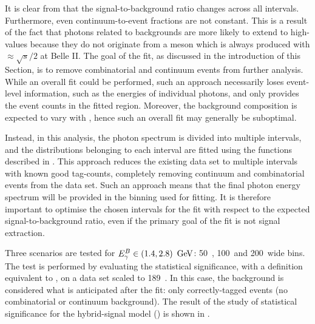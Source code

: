 It is clear from  that the signal-to-background ratio changes across all \EB intervals.
Furthermore, even continuum-to-\BB event fractions are not constant.
This is a result of the fact that photons related to \epem\ra\qqbar backgrounds are more likely to extend to high-\EB values because they do not originate from a \B meson which is always produced with $\approx\sqrt{s}/2$ at Belle II.
The goal of the fit, as discussed in the introduction of this Section, is to remove combinatorial \BB and continuum events from further analysis.
While an overall \Mbc fit could be performed, such an approach necessarily loses event-level information, such as the energies of individual photons, and only provides the event counts in the fitted \EB region.
Moreover, the background composition is expected to vary with \EB, hence such an overall fit may generally be suboptimal.

Instead, in this analysis, the photon spectrum is divided into multiple \EB intervals, and the \Mbc distributions belonging to each interval are fitted using the functions described in .
This approach reduces the existing data set to multiple \EB intervals with known good tag-\B counts, completely removing continuum and combinatorial \BB events from the data set.
Such an approach means that the final photon energy spectrum will be provided in the binning used for fitting.
It is therefore important to optimise the chosen intervals for the fit with respect to the expected \BtoXsgamma signal-to-background ratio, 
even if the primary goal of the fit is not signal extraction.

Three scenarios are tested for ${E^B_{\gamma}}\in(1.4,2.8)~\mathrm{\,Ge\kern -0.1em V}$: 50~\mev, 100~\mev and 200~\mev wide bins.
The test is performed by evaluating the statistical significance, with a definition equivalent to , on a data set scaled to 189~\invfb.
In this case, the background is considered what is anticipated after the \Mbc fit: only correctly-tagged \BB events (no combinatorial or continuum background).
The result of the study of statistical significance for the hybrid-signal model () is shown in .

